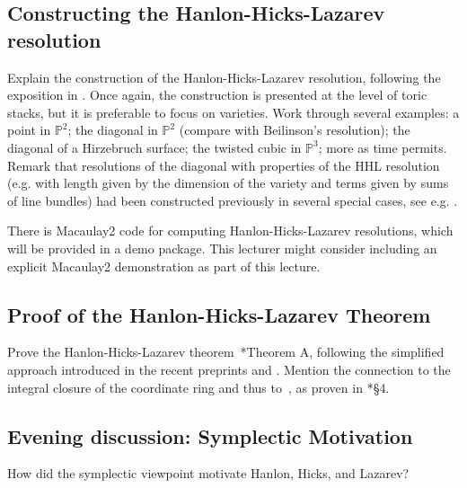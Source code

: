 \documentclass[11pt]{amsart}
\numberwithin{equation}{section}
\theoremstyle{definition}
\theoremstyle{remark}
\newcommand{\PP}{\mathbb P}
\begin{document}

\subsection{Constructing the Hanlon-Hicks-Lazarev resolution} Explain the construction of the Hanlon-Hicks-Lazarev resolution, following the exposition in \cite{BH25}. Once again, the construction is presented at the level of toric stacks, but it is preferable to focus on varieties. Work through several examples: a point in $\PP^2$; the diagonal in $\PP^2$ (compare with Beilinson's resolution); the diagonal of a Hirzebruch surface; the twisted cubic in $\PP^3$; more as time permits. Remark that resolutions of the diagonal with properties of the HHL resolution (e.g. with length given by the dimension of the variety and terms given by sums of line bundles) had been constructed previously in several special cases, see e.g. \cite{BETate, BPS01, BS24, CK}. 

There is Macaulay2 code for computing Hanlon-Hicks-Lazarev resolutions, which will be provided in a demo package.  This lecturer might consider including an explicit Macaulay2 demonstration as part of this lecture.

\subsection{Proof of the Hanlon-Hicks-Lazarev Theorem} Prove the Hanlon-Hicks-Lazarev theorem~\cite{HHL}*{Theorem A}, following the simplified approach introduced in the recent preprints \cite{BCHSY} and \cite{BH25}.  Mention the connection to the integral closure of the coordinate ring and thus to~\cite{BEshort}, as proven in \cite{BCHSY}*{\S4}.


\subsection*{Evening discussion: Symplectic Motivation}
How did the symplectic viewpoint motivate Hanlon, Hicks, and Lazarev?
\end{document}
